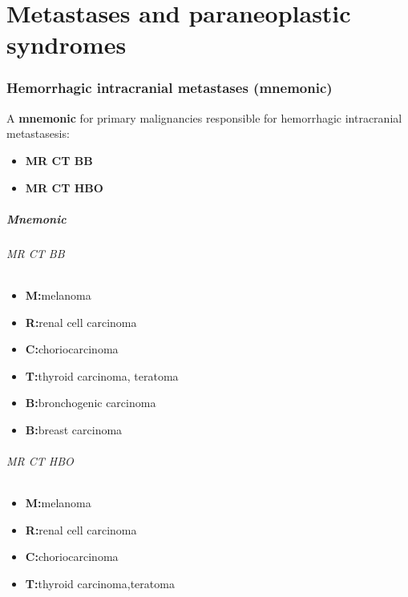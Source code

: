 \chapter{Metastases and paraneoplastic syndromes}

\subsection{Hemorrhagic intracranial metastases (mnemonic)}

A \textbf{mnemonic} for primary malignancies responsible for hemorrhagic intracranial metastasesis:

\begin{itemize}
	\item
	\textbf{MR CT BB}
	\item
	\textbf{MR CT HBO}
\end{itemize}


\paragraph{Mnemonic}


\subparagraph{MR CT BB}

\begin{itemize}
	\item
	\textbf{M:}melanoma
	\item
	\textbf{R:}renal cell carcinoma
\end{itemize}

\begin{itemize}
	\item
	\textbf{C:}choriocarcinoma
	\item
	\textbf{T:}thyroid carcinoma, teratoma
\end{itemize}

\begin{itemize}
	\item
	\textbf{B:}bronchogenic carcinoma
	\item
	\textbf{B:}breast carcinoma
\end{itemize}


\subparagraph{MR CT HBO}

\begin{itemize}
	\item
	\textbf{M:}melanoma
	\item
	\textbf{R:}renal cell carcinoma
\end{itemize}

\begin{itemize}
	\item
	\textbf{C:}choriocarcinoma
	\item
	\textbf{T:}thyroid carcinoma,teratoma
\end{itemize}

